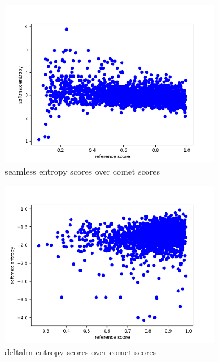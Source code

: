 \begin{figure}[ht]
\begin{subfigure}{0.4\linewidth}
        \includegraphics[width=\textwidth]{Latex/sections/images/seamlessentropy.png}
        \caption{seamless entropy scores over comet scores}
    \end{subfigure}
    \begin{subfigure}{0.4\linewidth}
        \includegraphics[width=\textwidth]{Latex/sections/images/dlmentropy.png}
        \caption{deltalm entropy scores over comet scores}
    \end{subfigure}
    \begin{subfigure}{0.4\linewidth}

\end{subfigure}
\end{figure}
